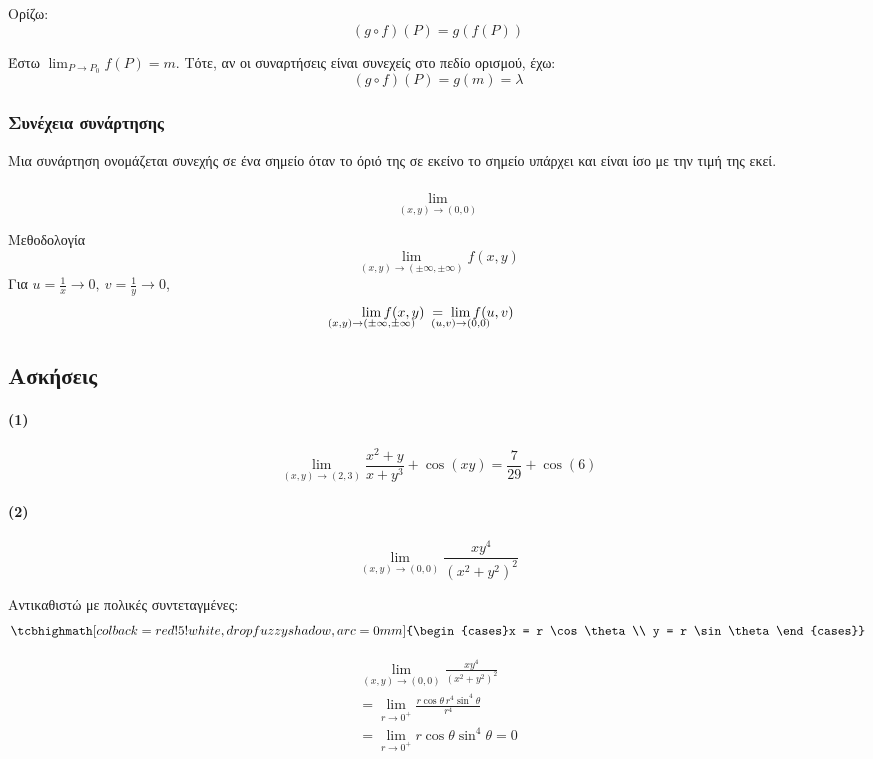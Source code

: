\documentclass[11pt,a4paper,titlepage,draft]{article}
\newcommand{\attnboxed}[1]{\tcbhighmath[colback=red!5!white,drop fuzzy shadow,arc=0mm]{#1}}
\begin{document}
Ορίζω:
\[
\left( g \circ f \right)(P) = g \left( f(P) \right)
\]

Έστω \( \lim _{P \to P_0} f(P) =m\). Τότε, αν οι συναρτήσεις είναι συνεχείς στο πεδίο ορισμού, έχω:
\[
\left( g \circ f \right)(P) = g(m) = \lambda
\]

\subsubsection{Συνέχεια συνάρτησης}
Μια συνάρτηση ονομάζεται συνεχής σε ένα σημείο όταν το όριό της σε εκείνο το σημείο υπάρχει και είναι ίσο με την τιμή της εκεί.

\subsubsection{}
\[\lim_{(x,y)\to(0,0)}
\]

\begin{infobox}{Μεθοδολογία}
\[ \lim_{(x,y) \to ( \pm \infty, \pm \infty )} f(x,y) \]
\tcblower
Για \(u=\frac{1}{x} \to 0, \ v=\frac{1}{y} \to 0\),
\[
\lim_{\mathclap{(x,y) \to ( \pm \infty, \pm \infty )}} f(x,y) \; = \;
\lim_{\mathclap{(u,v) \to ( 0,0 )}} f(u,v)
\]
\end{infobox}

\subsection{Ασκήσεις}
\paragraph{(1)}
\[
\lim_{(x,y) \to (2,3)} \frac{x^2+y}{x+y^3} + \cos (xy) = \frac{7}{29} + \cos(6)
\]
\paragraph{(2)}
\[
\lim_{(x,y) \to (0,0)} \frac{xy^4}{(x^2+y^2)^2}
\]

Αντικαθιστώ με πολικές συντεταγμένες:
\[
\attnboxed{\begin{cases}x = r \cos \theta \\ y = r \sin \theta\end{cases}}
\]

\begin{align*}
\lim_{(x,y) \to (0,0)} \frac{xy^4}{(x^2+y^2)^2} \\
= \lim_{r \to 0^+} \frac{r \cos \theta \, r^4 \sin^4 \theta}{r^4} \\
= \lim_{r \to 0^+} r \cos \theta \sin^4 \theta = 0
\end{align*}
\end{document}
